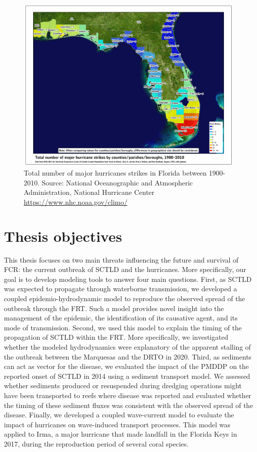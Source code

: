 \begin{figure}
    \centering
    \includegraphics[width=\textwidth]{chapters/intro/figures/hurricane_strikes.jpg}
    \caption{Total number of major hurricanes strikes in Florida between 1900-2010. Source: National Oceanographic and Atmospheric Administration, National Hurricane Center \url{https://www.nhc.noaa.gov/climo/}}
    \label{inro:landfall}
\end{figure}

\section{Thesis objectives}

This thesis focuses on two main threats influencing the future and survival of FCR: the current outbreak of SCTLD and the hurricanes. More specifically, our goal is to develop modeling tools to answer four main questions. First, as SCTLD was expected to propagate through waterborne transmission, we developed a coupled epidemio-hydrodynamic model to reproduce the observed spread of the outbreak through the FRT. Such a model provides novel insight into the management of the epidemic, the identification of its causative agent, and its mode of transmission. Second, we used this model to explain the timing of the propagation of SCTLD within the FRT. More specifically, we investigated whether the modeled hydrodynamics were explanatory of the apparent stalling of the outbreak between the Marquesas and the DRTO in 2020. Third, as sediments can act as vector for the disease, we evaluated the impact of the PMDDP on the reported onset of SCTLD in 2014 using a sediment transport model. We assessed whether sediments produced or resuspended during dredging operations might have been transported to reefs where disease was reported and evaluated whether the timing of these sediment fluxes was consistent with the observed spread of the disease. Finally, we developed a coupled wave-current model to evaluate the impact of hurricanes on wave-induced transport processes. This model was applied to Irma, a major hurricane that made landfall in the Florida Keys in 2017, during the reproduction period of several coral species.

